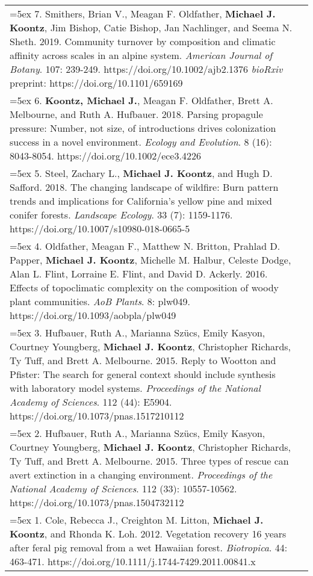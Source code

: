 \begin{longtable}{@{} >{\raggedright}p{6.25in} >{\raggedleft}X @{}}
\hangindent=5ex 7. Smithers, Brian V., Meagan F. Oldfather, \textbf{Michael J. Koontz}, Jim Bishop, Catie Bishop, Jan Nachlinger, and Seema N. Sheth. 2019. Community turnover by composition and climatic affinity across scales in an alpine system. \emph{American Journal of Botany}. 107: 239-249. https://doi.org/10.1002/ajb2.1376
\newline \emph{bioRxiv} preprint: https://doi.org/10.1101/659169 & \tabularnewline

\hangindent=5ex 6. \textbf{Koontz, Michael J.}, Meagan F. Oldfather, Brett A. Melbourne, and Ruth A. Hufbauer. 2018. Parsing propagule pressure: Number, not size, of introductions drives colonization success in a novel environment. \emph{Ecology and Evolution}. 8 (16): 8043-8054. https://doi.org/10.1002/ece3.4226 &  \tabularnewline

\hangindent=5ex 5. Steel, Zachary L., \textbf{Michael J. Koontz}, and Hugh D. Safford. 2018. The changing landscape of wildfire: Burn pattern trends and implications for California's yellow pine and mixed conifer forests. \emph{Landscape Ecology}. 33 (7): 1159-1176. https://doi.org/10.1007/s10980-018-0665-5 &  \tabularnewline

\hangindent=5ex 4. Oldfather, Meagan F., Matthew N. Britton, Prahlad D. Papper, \textbf{Michael J. Koontz}, Michelle M. Halbur, Celeste Dodge, Alan L. Flint, Lorraine E. Flint, and David D. Ackerly. 2016. Effects of topoclimatic complexity on the composition of woody plant communities. \emph{AoB Plants}. 8: plw049. https://doi.org/10.1093/aobpla/plw049 &  \tabularnewline

\hangindent=5ex 3. Hufbauer, Ruth A., Marianna Sz\"ucs, Emily Kasyon, Courtney Youngberg, \textbf{Michael J. Koontz}, Christopher Richards, Ty Tuff, and Brett A. Melbourne. 2015. Reply to Wootton and Pfister: The search for general context should include synthesis with laboratory model systems. \emph{Proceedings of the National Academy of Sciences}. 112 (44): E5904. https://doi.org/10.1073/pnas.1517210112 &  \tabularnewline

\hangindent=5ex 2. Hufbauer, Ruth A., Marianna Sz\"ucs, Emily Kasyon, Courtney Youngberg, \textbf{Michael J. Koontz}, Christopher Richards, Ty Tuff, and Brett A. Melbourne. 2015. Three types of rescue can avert extinction in a changing environment. \emph{Proceedings of the National Academy of Sciences}. 112 (33): 10557-10562. https://doi.org/10.1073/pnas.1504732112 &  \tabularnewline

\hangindent=5ex 1. Cole, Rebecca J., Creighton M. Litton, \textbf{Michael J. Koontz}, and Rhonda K. Loh. 2012. Vegetation recovery 16 years after feral pig removal from
a wet Hawaiian forest. \emph{Biotropica}. 44: 463-471. https://doi.org/10.1111/j.1744-7429.2011.00841.x &  \tabularnewline

\end{longtable}